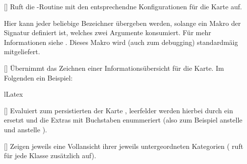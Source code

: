 %
%
%

[]
Ruft die -Routine mit den entsprechendne Konfigurationen für die Karte auf.


\begin{bemerkung}
    Hier kann jeder beliebige Bezeichner übergeben werden, solange ein Makro der Signatur  definiert ist, welches zwei Argumente konsumiert. Für mehr Informationen siehe . Dieses Makro wird (auch zum debugging) standardmäig mitgeliefert.
\end{bemerkung}

%
%
%

[]
Übernimmt das Zeichnen einer Informationsübersicht für die Karte. Im Folgenden ein Beispiel:
\begin{defaultlst}[morekeywords={[5]{\\SpielAxCreateCardClass,\\SpielAxKlasseAxNewCard,\\KarteA}}][listing side text,righthand width=2.5cm]{lLatex}
\KarteA
\end{defaultlst}

%
%
%

[]
Evaluiert zum persistierten  der Karte , leerfelder werden hierbei durch ein  ersetzt und die Extras mit Buchstaben enummeriert (also zum Beispiel  anstelle  und  anstelle ).

%
%
%

[\cmdlist{}]
Zeigen jeweils eine Vollansicht ihrer jeweils untergeordneten Kategorien ( ruft für jede Klasse zusätzlich  auf).

